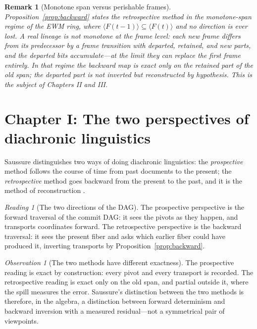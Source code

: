 \documentclass[11pt,a4paper]{article}
\newtheorem{remark}[principle]{Remark}
\theoremstyle{remark}
\newtheorem{observation}[principle]{Observation}
\newtheorem{reading}[principle]{Reading}
\newcommand{\spanof}[1]{\ensuremath{\langle #1\rangle}}  %
\begin{document}
\begin{remark}[Monotone span versus perishable frames]
\label{rem:monotone}
Proposition~\ref{prop:backward} states the retrospective method in the
monotone-span regime of the EWM ring, where
$\spanof{F(t{-}1)} \subseteq \spanof{F(t)}$ and no direction is ever lost.
A real lineage is not monotone at the frame level: each new frame differs
from its predecessor by a frame transition with departed, retained, and new
parts, and the departed bits accumulate---at the limit they can replace the
first frame entirely. In that regime the backward map is exact only on the
retained part of the old span; the departed part is not inverted but
reconstructed by hypothesis. This is the subject of Chapters II and III.
\end{remark}

\section{Chapter I: The two perspectives of diachronic linguistics}
\label{sec:ch1}

Saussure distinguishes two ways of doing diachronic linguistics: the
\emph{prospective} method follows the course of time from past documents to
the present; the \emph{retrospective} method goes backward from the present
to the past, and it is the method of reconstruction \cite[Part V,
ch.~I]{harris1983}.

\begin{reading}[The two directions of the DAG]
\label{read:perspectives}
The prospective perspective is the forward traversal of the commit DAG: it
sees the pivots as they happen, and transports coordinates forward. The
retrospective perspective is the backward traversal: it sees the present
fiber and asks which earlier fiber could have produced it, inverting
transports by Proposition~\ref{prop:backward}.
\end{reading}

\begin{observation}[The two methods have different exactness]
The prospective reading is exact by construction: every pivot and every
transport is recorded. The retrospective reading is exact only on the old
span, and partial outside it, where the spill measures the error. Saussure's
distinction between the two methods is therefore, in the algebra, a
distinction between forward determinism and backward inversion with a
measured residual---not a symmetrical pair of viewpoints.
\end{observation}
\end{document}
